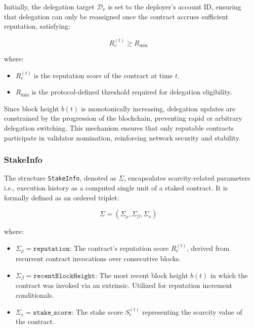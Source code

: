 \documentclass{article}
\begin{document}
Initially, the delegation target $\mathcal{D}_\nu$ is set to the deployer’s account ID, ensuring that delegation can only be reassigned once the contract accrues sufficient reputation, satisfying:

\begin{equation}
R_c^{(t)} \geq R_{\min}
\end{equation}

where:  
\begin{itemize}
    \item $R_c^{(t)}$ is the reputation score of the contract at time $t$.
    \item $R_{\min}$ is the protocol-defined threshold required for delegation eligibility.
\end{itemize}

Since block height $b(t)$ is monotonically increasing, delegation updates are constrained by the progression of the blockchain, preventing rapid or arbitrary delegation switching. This mechanism ensures that only reputable contracts participate in validator nomination, reinforcing network security and stability.

\subsubsection{StakeInfo}

The structure \texttt{StakeInfo}, denoted as $\Sigma$, encapsulates scarcity-related parameters i.e., execution history as a computed single unit of a staked contract. It is formally defined as an ordered triplet:

\begin{equation}
\Sigma = (\Sigma_\rho, \Sigma_\beta, \Sigma_s)
\end{equation}

where:
\begin{itemize}
    \item $\Sigma_\rho = \texttt{reputation}$: The contract's reputation score $R_c^{(t)}$, derived from recurrent contract invocations over consecutive blocks.
    \item $\Sigma_\beta = \texttt{recentBlockHeight}$: The most recent block height $b(t)$ in which the contract was invoked via an extrinsic. Utilized for reputation increment conditionals.
    \item $\Sigma_s = \texttt{stake\_score}$: The stake score $S_c^{(t)}$ representing the scarcity value of the contract.
\end{itemize}
\end{document}
